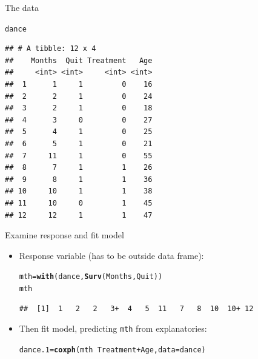 \documentclass[unknownkeysallowed]{beamer}\usepackage[]{graphicx}\usepackage[]{color}
\makeatletter
\newcommand{\hlopt}[1]{\textcolor[rgb]{0,0,0}{#1}}%
\newcommand{\hlstd}[1]{\textcolor[rgb]{0.345,0.345,0.345}{#1}}%
\newcommand{\hlkwb}[1]{\textcolor[rgb]{0.69,0.353,0.396}{#1}}%
\newcommand{\hlkwc}[1]{\textcolor[rgb]{0.333,0.667,0.333}{#1}}%
\newcommand{\hlkwd}[1]{\textcolor[rgb]{0.737,0.353,0.396}{\textbf{#1}}}%
\newenvironment{kframe}{%
 \def\at@end@of@kframe{}%
 \ifinner\ifhmode%
  \def\at@end@of@kframe{\end{minipage}}%
  \begin{minipage}{\columnwidth}%
 \fi\fi%
 \def\FrameCommand##1{\hskip\@totalleftmargin \hskip-\fboxsep
 \colorbox{shadecolor}{##1}\hskip-\fboxsep
     \hskip-\linewidth \hskip-\@totalleftmargin \hskip\columnwidth}%
 \MakeFramed {\advance\hsize-\width
   \@totalleftmargin\z@ \linewidth\hsize
   \@setminipage}}%
 {\par\unskip\endMakeFramed%
 \at@end@of@kframe}
\newenvironment{knitrout}{}{} %
\makeatother
\begin{document}
\begin{frame}[fragile]{The data}
  
\begin{knitrout}\small
{}\color{fgcolor}\begin{kframe}
\begin{alltt}
\hlstd{dance}
\end{alltt}
\begin{verbatim}
## # A tibble: 12 x 4
##    Months  Quit Treatment   Age
##     <int> <int>     <int> <int>
##  1      1     1         0    16
##  2      2     1         0    24
##  3      2     1         0    18
##  4      3     0         0    27
##  5      4     1         0    25
##  6      5     1         0    21
##  7     11     1         0    55
##  8      7     1         1    26
##  9      8     1         1    36
## 10     10     1         1    38
## 11     10     0         1    45
## 12     12     1         1    47
\end{verbatim}
\end{kframe}
\end{knitrout}
  
\end{frame}

\begin{frame}[fragile]{Examine response and fit model}
  
  \begin{itemize}
  \item Response variable (has to be outside data frame):

\begin{knitrout}\footnotesize
{}\color{fgcolor}\begin{kframe}
\begin{alltt}
\hlstd{mth}\hlkwb{=}\hlkwd{with}\hlstd{(dance,}\hlkwd{Surv}\hlstd{(Months,Quit))}
\hlstd{mth}
\end{alltt}
\begin{verbatim}
##  [1]  1   2   2   3+  4   5  11   7   8  10  10+ 12
\end{verbatim}
\end{kframe}
\end{knitrout}

  \item Then fit model, predicting \texttt{mth} from explanatories:

 
\begin{knitrout}
\color{fgcolor}\begin{kframe}
\begin{alltt}
\hlstd{dance.1}\hlkwb{=}\hlkwd{coxph}\hlstd{(mth}\hlopt{~}\hlstd{Treatment}\hlopt{+}\hlstd{Age,}\hlkwc{data}\hlstd{=dance)}
\end{alltt}
\end{kframe}
\end{knitrout}

  \end{itemize}
  
\end{frame}
\end{document}
